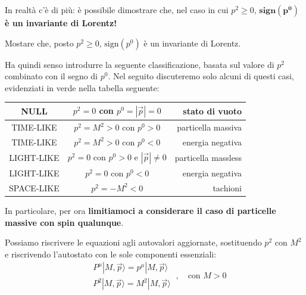 \documentclass[../main.tex]{subfiles}
\begin{document}
In realtà c'è di più: è possibile dimostrare che, nel caso in cui \(p^2\geqslant 0\), \(\mathbf{\textbf{sign}(p^0)}\) \textbf{è un invariante di Lorentz!}
\begin{exercise}
    Mostare che, posto \(p^2\geqslant 0\), \(\text{sign}(p^0)\) è un invariante di Lorentz.
\end{exercise}

Ha quindi senso introdurre la seguente classificazione, basata sul valore di $p^2$ combinato con il segno di $p^0$. Nel seguito discuteremo solo alcuni di questi casi, evidenziati in verde nella tabella seguente:
\begin{center}
    \begin{tabular}{|c|c|r|}
                \hline
                 NULL       \cellcolor{green!25}    &  $p^2=0$ con $p^0 = |\Vec{p}| =0$ \cellcolor{green!25}  & stato di vuoto \\ \hline
                 TIME-LIKE  \cellcolor{green!25}    &  $p^2 = M^2 > 0$ con $p^0 > 0$\cellcolor{green!25}  & particella massiva \\  \hline
                 TIME-LIKE  \cellcolor{red!25}      &  $p^2 = M^2 > 0$ con $p^0 < 0$\cellcolor{red!25}    & {energia negativa} \\  \hline
                 LIGHT-LIKE \cellcolor{green!25}    &  $p^2=0$ con $p^0 >0$ e $|\Vec{p}| \neq 0$ \cellcolor{green!25}  & particella massless \\ \hline
                 LIGHT-LIKE \cellcolor{red!25}      & $p^2=0$ con $p^0 <0$ \cellcolor{red!25}    & {energia negativa} \\ \hline
                 SPACE-LIKE \cellcolor{red!25}      & $p^2 = -M^2 < 0$\cellcolor{red!25}    & {tachioni} \\ \hline
    \end{tabular}
\end{center}
In particolare, per ora \textbf{limitiamoci a considerare il caso di particelle massive con spin qualunque}.

Possiamo riscrivere le equazioni agli autovalori aggiornate, sostituendo $p^2$ con $M^2$ e riscrivendo l'autostato con le sole componenti essenziali:
\[
\boxed{
    \begin{aligned}
        &P^\mu|M, \Vec{p}\rangle = p^\mu|M, \Vec{p}\rangle\\
        &P^2|M, \Vec{p}\rangle = M^2|M, \Vec{p}\rangle
    \end{aligned}
}~, \quad \text{con } M>0
\]
\end{document}
